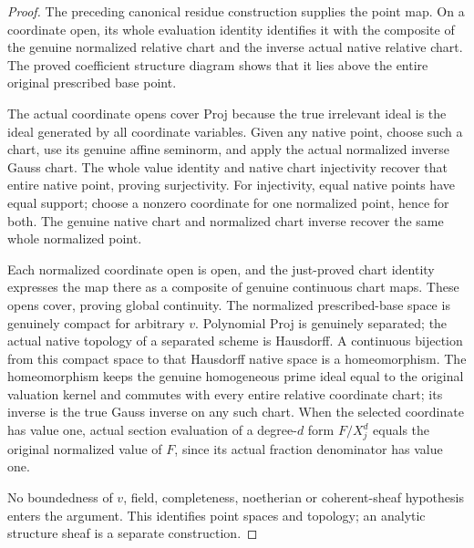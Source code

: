 \begin{proof}
The preceding canonical residue construction supplies the point map.
On a coordinate open, its whole evaluation identity identifies it with
the composite of the genuine normalized relative chart and the inverse
actual native relative chart. The proved coefficient structure diagram
shows that it lies above the entire original prescribed base point.

The actual coordinate opens cover Proj because the true irrelevant ideal
is the ideal generated by all coordinate variables. Given any native
point, choose such a chart, use its genuine affine seminorm, and apply
the actual normalized inverse Gauss chart. The whole value identity and
native chart injectivity recover that entire native point, proving
surjectivity. For injectivity, equal native points have equal support;
choose a nonzero coordinate for one normalized point, hence for both.
The genuine native chart and normalized chart inverse recover the same
whole normalized point.

Each normalized coordinate open is open, and the just-proved chart
identity expresses the map there as a composite of genuine continuous
chart maps. These opens cover, proving global continuity. The normalized
prescribed-base space is genuinely compact for arbitrary $v$. Polynomial
Proj is genuinely separated; the actual native topology of a separated
scheme is Hausdorff. A continuous bijection from this compact space to
that Hausdorff native space is a homeomorphism. The homeomorphism keeps the genuine homogeneous prime ideal equal to
the original valuation kernel and commutes with every entire relative
coordinate chart; its inverse is the true Gauss inverse on any such
chart. When the selected coordinate has value one, actual section
evaluation of a degree-$d$ form $F/X_j^d$ equals the original normalized
value of $F$, since its actual fraction denominator has value one.

No boundedness of $v$,
field, completeness, noetherian or coherent-sheaf hypothesis enters the
argument. This identifies point spaces and topology; an analytic structure
sheaf is a separate construction.
\end{proof}
